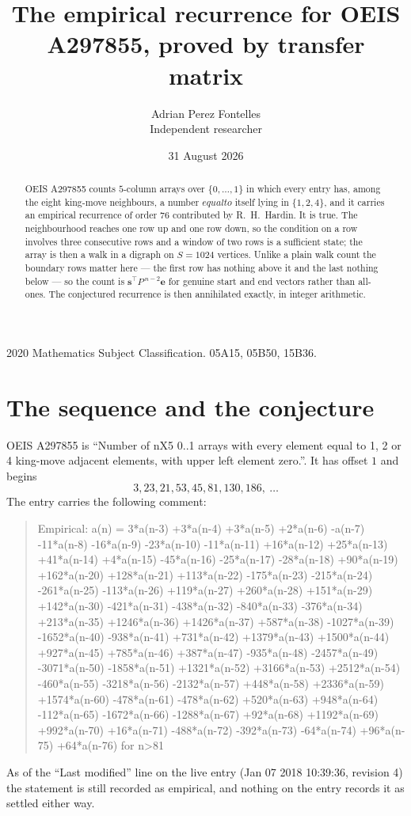 \documentclass[11pt,a4paper]{article}
\title{The empirical recurrence for OEIS A297855, proved by transfer matrix}
\author{Adrian Perez Fontelles\\ \small Independent researcher}
\date{31 August 2026}
\theoremstyle{plain}
\theoremstyle{definition}
\begin{document}
\maketitle

\begin{abstract}
OEIS A297855 counts $5$-column arrays over $\{0,\dots,1\}$ in which every entry has,
among the eight king-move neighbours, a number $equal to$ itself lying in $\{1,2,4\}$, and it carries an empirical
recurrence of order $76$ contributed by R.~H.~Hardin. It is true. The neighbourhood
reaches one row up and one row down, so the condition on a row involves three consecutive
rows and a window of two rows is a sufficient state; the array is then a walk in a digraph
on $S=1024$ vertices. Unlike a plain walk count the boundary rows matter here --- the first
row has nothing above it and the last nothing below --- so the count is
$\mathbf{s}^{\!\top}P^{\,n-2}\mathbf{e}$ for genuine start and end vectors rather than
all-ones. The conjectured recurrence is then annihilated exactly, in integer arithmetic.
\end{abstract}

\noindent\small 2020 Mathematics Subject Classification. 05A15, 05B50, 15B36.\normalsize

\section{The sequence and the conjecture}

OEIS A297855 is ``Number of nX5 0..1 arrays with every element equal to 1, 2 or 4 king-move adjacent elements, with upper left element zero.''. It has offset
$1$ and begins
\[
3, 23, 21, 53, 45, 81, 130, 186,\ \dots
\]
The entry carries the following comment:
\begin{quote}\small
Empirical: a(n) = 3*a(n-3) +3*a(n-4) +3*a(n-5) +2*a(n-6) -a(n-7) -11*a(n-8) -16*a(n-9) -23*a(n-10) -11*a(n-11) +16*a(n-12) +25*a(n-13) +41*a(n-14) +4*a(n-15) -45*a(n-16) -25*a(n-17) -28*a(n-18) +90*a(n-19) +162*a(n-20) +128*a(n-21) +113*a(n-22) -175*a(n-23) -215*a(n-24) -261*a(n-25) -113*a(n-26) +119*a(n-27) +260*a(n-28) +151*a(n-29) +142*a(n-30) -421*a(n-31) -438*a(n-32) -840*a(n-33) -376*a(n-34) +213*a(n-35) +1246*a(n-36) +1426*a(n-37) +587*a(n-38) -1027*a(n-39) -1652*a(n-40) -938*a(n-41) +731*a(n-42) +1379*a(n-43) +1500*a(n-44) +927*a(n-45) +785*a(n-46) +387*a(n-47) -935*a(n-48) -2457*a(n-49) -3071*a(n-50) -1858*a(n-51) +1321*a(n-52) +3166*a(n-53) +2512*a(n-54) -460*a(n-55) -3218*a(n-56) -2132*a(n-57) +448*a(n-58) +2336*a(n-59) +1574*a(n-60) -478*a(n-61) -478*a(n-62) +520*a(n-63) +948*a(n-64) -112*a(n-65) -1672*a(n-66) -1288*a(n-67) +92*a(n-68) +1192*a(n-69) +992*a(n-70) +16*a(n-71) -488*a(n-72) -392*a(n-73) -64*a(n-74) +96*a(n-75) +64*a(n-76) for n>81
\end{quote}
As of the ``Last modified'' line on the live entry (Jan 07 2018 10:39:36, revision
4) the statement is still recorded as empirical, and nothing on the entry
records it as settled either way.
\end{document}
